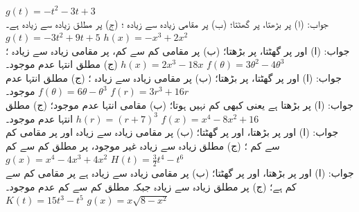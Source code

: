 $g(t)=-t^2-3t+3$\\
جواب:
(ا)  پر بڑھتا،  پر گھٹتا؛  (ب)  پر مقامی زیادہ سے زیادہ ؛ (ج)  پر مطلق زیادہ سے زیادہ  ہے۔ 
$g(t)=-3t^2+9t+5$
$h(x)=-x^3+2x^2$\\
جواب:\quad
(ا)  اور  پر گھٹتا،  پر بڑھتا؛ (ب)  پر مقامی کم سے کم،  پر مقامی زیادہ سے زیادہ ؛ (ج) مطلق انتہا عدم موجود۔
$h(x)=2x^3-18x$
$f(\theta)=3\theta^2-4\theta^3$\\
جواب:\quad
(ا)  اور  پر گھٹتا،  پر بڑھتا؛ (ب)  پر مقامی زیادہ سے زیادہ ؛ (ج) مطلق انتہا عدم موجود۔ 
$f(\theta)=6\theta-\theta^3$
$f(r)=3r^3+16r$\\
جواب:\quad
(ا)  پر بڑھتا ہے یعنی کبھی کم نہیں ہوتا؛ (ب) مقامی انتہا عدم موجود؛ (ج) مطلق انتہا عدم موجود۔
$h(r)=(r+7)^3$
$f(x)=x^4-8x^2+16$\\
جواب:\quad
(ا)  اور  پر بڑھتا،  اور  پر گھٹتا؛ (ب)  پر مقامی زیادہ سے زیادہ  اور  پر مقامی کم سے کم ؛ (ج) مطلق زیادہ سے زیادہ غیر موجود،  پر مطلق کم سے کم 
$g(x)=x^4-4x^3+4x^2$
$H(t)=\tfrac{3}{2}t^4-t^6$\\
جواب:\quad
(ا)  اور  پر بڑھتا،  اور  پر گھٹتا؛ (ب)  پر مقامی زیادہ سے زیادہ   ہے  پر مقامی کم سے کم   ہے؛ (ج)  پر مطلق زیادہ سے زیادہ جبکہ مطلق کم سے کم عدم موجود۔
$K(t)=15t^3-t^5$
$g(x)=x\sqrt{8-x^2}$\\
